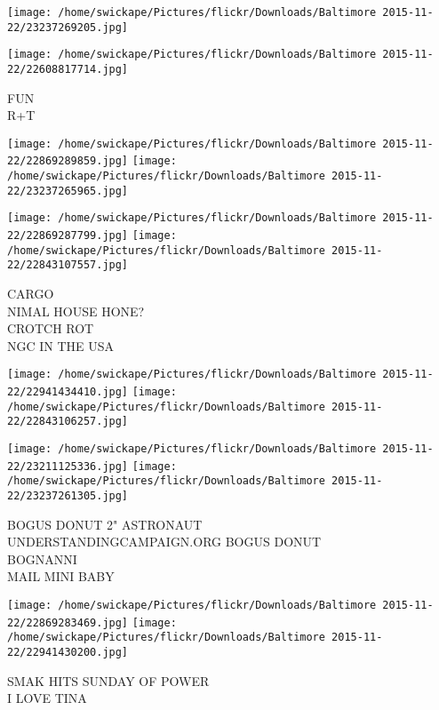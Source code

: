 \documentclass[10pt,letterpaper]{article}
\begin{document}
\texttt{[image: /home/swickape/Pictures/flickr/Downloads/Baltimore 2015-11-22/23237269205.jpg]}

\vspace{0.25in}
\texttt{[image: /home/swickape/Pictures/flickr/Downloads/Baltimore 2015-11-22/22608817714.jpg]}

FUN\\
R+T\\
\pagebreak

\texttt{[image: /home/swickape/Pictures/flickr/Downloads/Baltimore 2015-11-22/22869289859.jpg]}
\texttt{[image: /home/swickape/Pictures/flickr/Downloads/Baltimore 2015-11-22/23237265965.jpg]}

\texttt{[image: /home/swickape/Pictures/flickr/Downloads/Baltimore 2015-11-22/22869287799.jpg]}
\texttt{[image: /home/swickape/Pictures/flickr/Downloads/Baltimore 2015-11-22/22843107557.jpg]}

CARGO\\
NIMAL HOUSE HONE?\\
CROTCH ROT\\
NGC IN THE USA\\
\pagebreak

\texttt{[image: /home/swickape/Pictures/flickr/Downloads/Baltimore 2015-11-22/22941434410.jpg]}
\texttt{[image: /home/swickape/Pictures/flickr/Downloads/Baltimore 2015-11-22/22843106257.jpg]}

\texttt{[image: /home/swickape/Pictures/flickr/Downloads/Baltimore 2015-11-22/23211125336.jpg]}
\texttt{[image: /home/swickape/Pictures/flickr/Downloads/Baltimore 2015-11-22/23237261305.jpg]}

BOGUS DONUT 2" ASTRONAUT\\
UNDERSTANDINGCAMPAIGN.ORG BOGUS DONUT\\
BOGNANNI\\
MAIL MINI BABY\\
\pagebreak

\texttt{[image: /home/swickape/Pictures/flickr/Downloads/Baltimore 2015-11-22/22869283469.jpg]}
\texttt{[image: /home/swickape/Pictures/flickr/Downloads/Baltimore 2015-11-22/22941430200.jpg]}

SMAK HITS SUNDAY OF POWER\\
I LOVE TINA\\
\pagebreak
\end{document}
